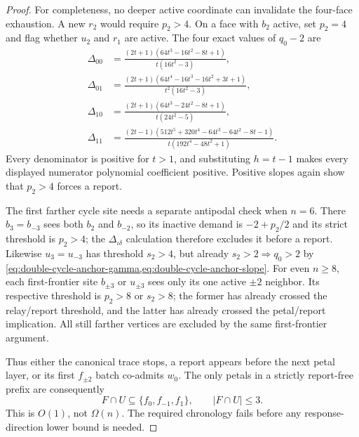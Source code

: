 \begin{proof}
For completeness, no deeper active coordinate can invalidate the four-face
exhaustion.  A new $r_2$ would require $p_2>4$.  On a face with $b_2$ active,
set $p_2=4$ and flag whether $u_2$ and $r_1$ are active.  The four exact
values of $q_0-2$ are
\begin{equation}
\begin{aligned}
 \Delta_{00}&=\frac{(2t+1)(64t^3-16t^2-8t+1)}{t(16t^2-3)},\\
 \Delta_{01}&=\frac{(2t+1)(64t^4-16t^3-16t^2+3t+1)}
 {t^2(16t^2-3)},\\
 \Delta_{10}&=\frac{(2t+1)(64t^3-24t^2-8t+1)}{t(24t^2-5)},\\
 \Delta_{11}&=\frac{(2t-1)(512t^5+320t^4-64t^3-64t^2-8t-1)}
 {t(192t^4-48t^2+1)}.
\end{aligned}
 \label{eq:double-cycle-anchor-deep}
\end{equation}
Every denominator is positive for $t>1$, and substituting $h=t-1$ makes
every displayed numerator polynomial coefficient positive.  Positive slopes
again show that $p_2>4$ forces a report.

The first farther cycle site needs a separate antipodal check when $n=6$.
There $b_3=b_{-3}$ sees both $b_2$ and $b_{-2}$, so its inactive demand is
$-2+p_2/2$ and its strict threshold is $p_2>4$; the
$\Delta_{\iota\delta}$ calculation therefore excludes it before a report.
Likewise $u_3=u_{-3}$ has threshold $s_2>4$, but already
$s_2>2\Longrightarrow q_0>2$ by
\cref{eq:double-cycle-anchor-gamma,eq:double-cycle-anchor-slope}.  For even
$n\geq8$, each first-frontier site $b_{\pm3}$ or $u_{\pm3}$ sees only its one
active $\pm2$ neighbor.  Its respective threshold is $p_2>8$ or $s_2>8$;
the former has already crossed the relay/report threshold, and the latter has
already crossed the petal/report implication.  All still farther vertices
are excluded by the same first-frontier argument.

Thus either the canonical trace stops, a report appears before the next
petal layer, or its first $f_{\pm2}$ batch co-admits $w_0$.  The only petals
in a strictly report-free prefix are consequently
\begin{equation}
 F\cap U\subseteq\{f_0,f_{-1},f_1\},
 \qquad |F\cap U|\leq3.
 \label{eq:double-cycle-anchor-three-petal}
\end{equation}
This is $O(1)$, not $\Omega(n)$.  The required chronology fails before any
response-direction lower bound is needed.
\end{proof}

